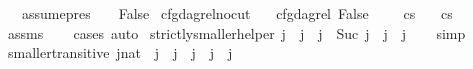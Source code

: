 \begin{isabellebody}
\ \ {\isacharbar}{\kern0pt}\ {\isachardoublequoteopen}assume{\isacharunderscore}{\kern0pt}pres\ {\isacharunderscore}{\kern0pt}\ {\isacharunderscore}{\kern0pt}\ {\isacharequal}{\kern0pt}\ False{\isachardoublequoteclose}\isanewline
\isanewline
{}\isamarkupfalse%
\ cfg{\isacharunderscore}{\kern0pt}dag{\isacharunderscore}{\kern0pt}rel{\isacharunderscore}{\kern0pt}no{\isacharunderscore}{\kern0pt}cut{\isacharcolon}{\kern0pt}\isanewline
\ \ \ {\isachardoublequoteopen}cfg{\isacharunderscore}{\kern0pt}dag{\isacharunderscore}{\kern0pt}rel\ False\ {\isacharbrackleft}{\kern0pt}{\isacharbrackright}{\kern0pt}\ {\isacharbrackleft}{\kern0pt}{\isacharbrackright}{\kern0pt}\ {\isacharbrackleft}{\kern0pt}{\isacharbrackright}{\kern0pt}\ {\isacharbrackleft}{\kern0pt}{\isacharbrackright}{\kern0pt}\ cs{\isachardoublequoteclose}\isanewline
\ \ \ {\isachardoublequoteopen}cs\ {\isacharequal}{\kern0pt}\ {\isacharbrackleft}{\kern0pt}{\isacharbrackright}{\kern0pt}{\isachardoublequoteclose}\isanewline
%
\isadelimproof
\ \ %
\endisadelimproof
%
\isatagproof
{}\isamarkupfalse%
\ assms\isanewline
\ \ \isamarkupfalse%
\ {\isacharparenleft}{\kern0pt}cases{\isacharparenright}{\kern0pt}\ auto%
\endisatagproof
{\isafoldproof}%
%
\isadelimproof
\isanewline
%
\endisadelimproof
\isanewline
{}\isamarkupfalse%
\ strictly{\isacharunderscore}{\kern0pt}smaller{\isacharunderscore}{\kern0pt}helper{\isacharcolon}{\kern0pt}\ {\isachardoublequoteopen}j{\isacharprime}{\kern0pt}{\isacharprime}{\kern0pt}\ {\isasymle}\ j{\isacharprime}{\kern0pt}\ {\isasymLongrightarrow}\ j\ {\isacharequal}{\kern0pt}\ Suc\ j{\isacharprime}{\kern0pt}\ {\isasymLongrightarrow}\ j{\isacharprime}{\kern0pt}{\isacharprime}{\kern0pt}\ {\isacharless}{\kern0pt}\ j{\isachardoublequoteclose}\isanewline
%
\isadelimproof
\ \ %
\endisadelimproof
%
\isatagproof
{}\isamarkupfalse%
\ simp%
\endisatagproof
{\isafoldproof}%
%
\isadelimproof
\isanewline
%
\endisadelimproof
\isanewline
{}\isamarkupfalse%
\ smaller{\isacharunderscore}{\kern0pt}transitive{\isacharcolon}{\kern0pt}\ {\isachardoublequoteopen}{\isacharparenleft}{\kern0pt}j{\isacharprime}{\kern0pt}{\isacharprime}{\kern0pt}{\isacharcolon}{\kern0pt}{\isacharcolon}{\kern0pt}nat{\isacharparenright}{\kern0pt}\ {\isasymle}\ j{\isacharprime}{\kern0pt}\ {\isasymLongrightarrow}\ j{\isacharprime}{\kern0pt}\ {\isasymle}\ j\ {\isasymLongrightarrow}\ j{\isacharprime}{\kern0pt}{\isacharprime}{\kern0pt}\ {\isasymle}\ j{\isachardoublequoteclose}\isanewline

\end{isabellebody}
